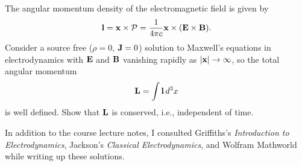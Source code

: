 \documentclass[11pt]{article}
\newcommand{\beq}{\begin{equation*}}
\newcommand{\eeq}{\end{equation*}}
\newenvironment{statement}[1]
{
	\section{#1}
	\color{darkgray}
	\ignorespaces
}
{
}
\begin{document}
\begin{statement}{}
	The angular momentum density of the electromagnetic field is given by
	\beq
		\vl = \vx \times \vcP
		= \frac{1}{4\pi c} \vx \times (\vE \times \vB).
	\eeq
	Consider a source free ($\rho = 0$, $\vb{J} = 0$) solution to Maxwell's equations in electrodynamics with $\vb{E}$ and $\vb{B}$ vanishing rapidly as $\abs{\vb{x}} \to \infty$, so the total angular momentum
	\beq
		\vL = \int \vl \dcx
	\eeq
	is well defined.  Show that $\vb{L}$ is conserved, i.e., independent of time.
\end{statement}



\vfill
In addition to the course lecture notes, I consulted Griffiths's \emph{Introduction to Electrodynamics}, Jackson's \emph{Classical Electrodynamics}, and Wolfram Mathworld while writing up these solutions.
\end{document}
